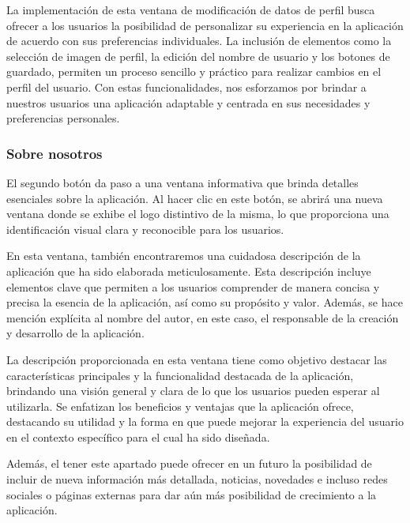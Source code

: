 \documentclass{article}
\begin{document}
La implementación de esta ventana de modificación de datos de perfil busca ofrecer a los usuarios la posibilidad de personalizar su experiencia en la aplicación de acuerdo con sus preferencias individuales. La inclusión de elementos como la selección de imagen de perfil, la edición del nombre de usuario y los botones de guardado, permiten un proceso sencillo y práctico para realizar cambios en el perfil del usuario. Con estas funcionalidades, nos esforzamos por brindar a nuestros usuarios una aplicación adaptable y centrada en sus necesidades y preferencias personales.

\subsubsection{Sobre nosotros}

El segundo botón da paso a una ventana informativa que brinda detalles esenciales sobre la aplicación. Al hacer clic en este botón, se abrirá una nueva ventana donde se exhibe el logo distintivo de la misma, lo que proporciona una identificación visual clara y reconocible para los usuarios.

En esta ventana, también encontraremos una cuidadosa descripción de la aplicación que ha sido elaborada meticulosamente. Esta descripción incluye elementos clave que permiten a los usuarios comprender de manera concisa y precisa la esencia de la aplicación, así como su propósito y valor. Además, se hace mención explícita al nombre del autor, en este caso, el responsable de la creación y desarrollo de la aplicación.

La descripción proporcionada en esta ventana tiene como objetivo destacar las características principales y la funcionalidad destacada de la aplicación, brindando una visión general y clara de lo que los usuarios pueden esperar al utilizarla. Se enfatizan los beneficios y ventajas que la aplicación ofrece, destacando su utilidad y la forma en que puede mejorar la experiencia del usuario en el contexto específico para el cual ha sido diseñada.

Además, el tener este apartado puede ofrecer en un futuro la posibilidad de incluir de nueva información más detallada, noticias, novedades e incluso redes sociales o páginas externas para dar aún más posibilidad de crecimiento a la aplicación.
\end{document}
